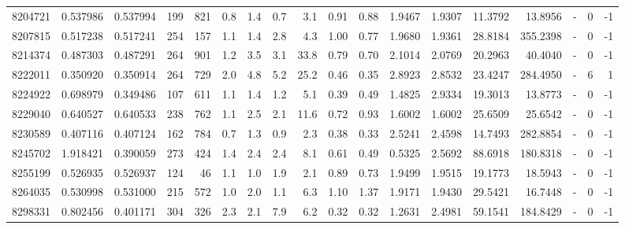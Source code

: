 \begin{tabular}{rrrrrrrrrrrrrrrlrr}
   8204721 & 0.537986 &   0.537994 &  199 &  821 &      0.8 &      1.4 &     0.7 &      3.1 &       0.91 &        0.88 &  1.9467 &  1.9307 &   11.3792 &   13.8956 &             - &        0 &         -1 \\
   8207815 & 0.517238 &   0.517241 &  254 &  157 &      1.1 &      1.4 &     2.8 &      4.3 &       1.00 &        0.77 &  1.9680 &  1.9361 &   28.8184 &  355.2398 &             - &        0 &         -1 \\
   8214374 & 0.487303 &   0.487291 &  264 &  901 &      1.2 &      3.5 &     3.1 &     33.8 &       0.79 &        0.70 &  2.1014 &  2.0769 &   20.2963 &   40.4040 &             - &        0 &         -1 \\
   8222011 & 0.350920 &   0.350914 &  264 &  729 &      2.0 &      4.8 &     5.2 &     25.2 &       0.46 &        0.35 &  2.8923 &  2.8532 &   23.4247 &  284.4950 &             - &        6 &          1 \\
   8224922 & 0.698979 &   0.349486 &  107 &  611 &      1.1 &      1.4 &     1.2 &      5.1 &       0.39 &        0.49 &  1.4825 &  2.9334 &   19.3013 &   13.8773 &             - &        0 &         -1 \\
   8229040 & 0.640527 &   0.640533 &  238 &  762 &      1.1 &      2.5 &     2.1 &     11.6 &       0.72 &        0.93 &  1.6002 &  1.6002 &   25.6509 &   25.6542 &             - &        0 &         -1 \\
   8230589 & 0.407116 &   0.407124 &  162 &  784 &      0.7 &      1.3 &     0.9 &      2.3 &       0.38 &        0.33 &  2.5241 &  2.4598 &   14.7493 &  282.8854 &             - &        0 &         -1 \\
   8245702 & 1.918421 &   0.390059 &  273 &  424 &      1.4 &      2.4 &     2.4 &      8.1 &       0.61 &        0.49 &  0.5325 &  2.5692 &   88.6918 &  180.8318 &             - &        0 &         -1 \\
   8255199 & 0.526935 &   0.526937 &  124 &   46 &      1.1 &      1.0 &     1.9 &      2.1 &       0.89 &        0.73 &  1.9499 &  1.9515 &   19.1773 &   18.5943 &             - &        0 &         -1 \\
   8264035 & 0.530998 &   0.531000 &  215 &  572 &      1.0 &      2.0 &     1.1 &      6.3 &       1.10 &        1.37 &  1.9171 &  1.9430 &   29.5421 &   16.7448 &             - &        0 &         -1 \\
   8298331 & 0.802456 &   0.401171 &  304 &  326 &      2.3 &      2.1 &     7.9 &      6.2 &       0.32 &        0.32 &  1.2631 &  2.4981 &   59.1541 &  184.8429 &             - &        0 &         -1 \\

\end{tabular}
